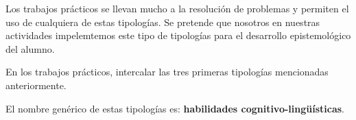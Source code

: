 \documentclass[12pt]{report}
\newcounter{it}
\theoremstyle{largebreak}
\begin{document}
    Los trabajos prácticos se llevan mucho a la resolución de problemas y permiten el uso de cualquiera de estas tipologías. Se pretende que nosotros en nuestras actividades impelemtemos este tipo de tipologías para el desarrollo epistemológico del alumno.

    \begin{excer}
        En los trabajos prácticos, intercalar las tres primeras tipologías mencionadas anteriormente.
    \end{excer}

    El nombre genérico de estas tipologías es: \textbf{habilidades cognitivo-lingüísticas}.
\end{document}
